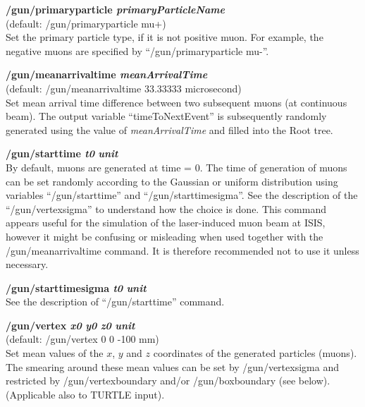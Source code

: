 \documentclass[twoside]{dis04}
\begin{document}
\begin{description}
\item{\bf /gun/primaryparticle \emph{primaryParticleName}}\\
        (default: /gun/primaryparticle mu+)\\
	Set the primary particle type, if it is not positive muon.  For example, the negative muons
	are specified by ``/gun/primaryparticle mu-''.

\item{\bf /gun/meanarrivaltime \emph{meanArrivalTime}}\\
        (default: /gun/meanarrivaltime 33.33333 microsecond)\\
        Set mean arrival time difference between two subsequent muons (at continuous beam).
	The output variable ``timeToNextEvent'' is subsequently randomly generated using
	the value of \emph{meanArrivalTime} and filled into the Root tree.

\item{\bf /gun/starttime \emph{t0} \emph{unit}}\\
	By default, muons are generated at time = 0.  The time of generation of muons can be
        set randomly according to the Gaussian or uniform distribution using variables
	``/gun/starttime'' and ``/gun/starttimesigma''.  See the description of the
	``/gun/vertexsigma'' to understand how the choice is done. This command appears
	useful for the simulation of the laser-induced muon beam at ISIS,
	however it might be confusing or misleading when used together with
	the /gun/meanarrivaltime command.  It is therefore recommended not to use it
	unless necessary.

\item{\bf /gun/starttimesigma \emph{t0} \emph{unit}}\\
	See the description of ``/gun/starttime'' command.

\item{\bf /gun/vertex \emph{x0} \emph{y0} \emph{z0} \emph{unit}}\\
	(default: /gun/vertex 0 0 -100 mm) \\
	Set mean values of the $x$, $y$ and $z$ coordinates of the generated particles (muons).
	The smearing around these mean values can be set by /gun/vertexsigma and
        restricted by /gun/vertexboundary and/or /gun/boxboundary (see below).\\
	(Applicable also to TURTLE input).


\end{description}
\end{document}
